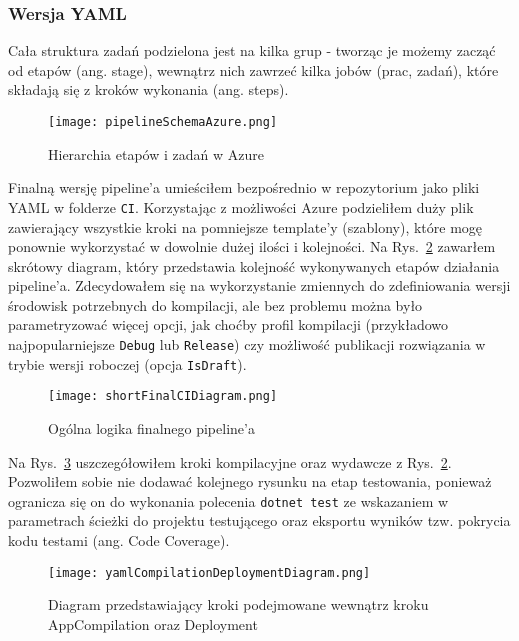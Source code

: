 \subsubsection{Wersja YAML}
Cała struktura zadań podzielona jest na kilka grup - tworząc je możemy zacząć od etapów (ang. stage), 
wewnątrz nich zawrzeć kilka jobów (prac, zadań), które składają się z kroków wykonania (ang. steps).

\begin{figure}[ht]
    \centering
    \texttt{[image: pipelineSchemaAzure.png]}
    \caption{Hierarchia etapów i zadań w Azure~\cite{pipelineSchemaAzure_source}}
    \label{img:pipelineSchemaAzure}
\end{figure}
Finalną wersję pipeline'a umieściłem bezpośrednio w repozytorium jako pliki YAML w folderze \verb|CI|.
Korzystając z możliwości Azure podzieliłem duży plik zawierający wszystkie kroki 
na pomniejsze template'y (szablony), które mogę ponownie wykorzystać w dowolnie dużej 
ilości i kolejności.
Na Rys.~\ref{img:shortFinalCIDiagram} zawarłem skrótowy diagram, który 
przedstawia kolejność wykonywanych etapów działania pipeline'a. 
Zdecydowałem się na wykorzystanie zmiennych do zdefiniowania wersji środowisk potrzebnych 
do kompilacji, ale bez problemu można było parametryzować więcej opcji, jak choćby 
profil kompilacji (przykładowo najpopularniejsze \verb|Debug| lub \verb|Release|) czy 
możliwość publikacji rozwiązania w trybie wersji roboczej (opcja \verb|IsDraft|).

\begin{figure}[hb]
    \centering
    \texttt{[image: shortFinalCIDiagram.png]}
    \caption{Ogólna logika finalnego pipeline'a}
    \label{img:shortFinalCIDiagram}
\end{figure}

Na Rys.~\ref{img:yamlCompilationDeploymentDiagram} uszczegółowiłem kroki kompilacyjne 
oraz wydawcze z Rys.~\ref{img:shortFinalCIDiagram}. Pozwoliłem sobie nie dodawać kolejnego 
rysunku na etap testowania, ponieważ ogranicza się on do wykonania polecenia \verb|dotnet test|
ze wskazaniem w parametrach ścieżki do projektu testującego oraz eksportu 
wyników tzw. pokrycia kodu testami (ang. Code Coverage).

\begin{figure}[ht]
    \centering
    \texttt{[image: yamlCompilationDeploymentDiagram.png]}
    \caption{Diagram przedstawiający kroki podejmowane wewnątrz kroku AppCompilation oraz Deployment}
    \label{img:yamlCompilationDeploymentDiagram}
\end{figure}

